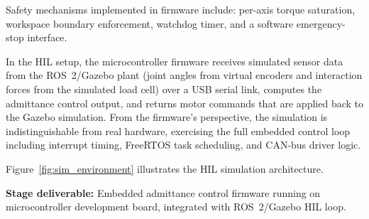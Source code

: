Safety mechanisms implemented in firmware include: per-axis torque saturation, workspace boundary enforcement, watchdog timer, and a software emergency-stop interface.

In the HIL setup, the microcontroller firmware receives simulated sensor data from the ROS~2/Gazebo plant (joint angles from virtual encoders and interaction forces from the simulated load cell) over a USB serial link, computes the admittance control output, and returns motor commands that are applied back to the Gazebo simulation.
From the firmware's perspective, the simulation is indistinguishable from real hardware, exercising the full embedded control loop including interrupt timing, FreeRTOS task scheduling, and CAN-bus driver logic.

Figure~\ref{fig:sim_environment} illustrates the HIL simulation architecture.

\textbf{Stage deliverable:} Embedded admittance control firmware running on microcontroller development board, integrated with ROS~2/Gazebo HIL loop.

